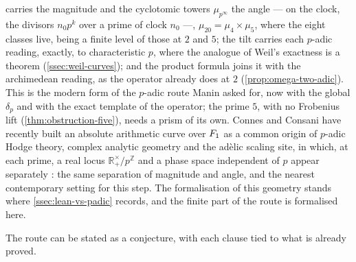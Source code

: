 carries the magnitude and the cyclotomic towers
$\mu_{p^\infty}$ the angle --- on the clock, the
divisors $n_0p^k$ over a prime of clock $n_0$ ---, $\mu_{20}=\mu_4\times\mu_5$,
    where the eight classes live, being a finite level of those at $2$ and $5$; the tilt \cite{scholze12} carries each $p$-adic reading, exactly, to characteristic $p$, where the analogue of Weil's exactness is a theorem (\cref{ssec:weil-curves}); and the product formula joins it with the archimedean reading, as the
    operator already does at $2$ (\cref{prop:omega-two-adic}).  This is the modern form of the $p$-adic route
    Manin asked for, now with the global $\delta_p$ and with the exact template of the operator; the prime
    $5$, with no Frobenius lift (\cref{thm:obstruction-five}), needs a prism of its own.  Connes and
    Consani have recently built an absolute arithmetic curve over $F_1$ as a common origin of
    $p$-adic Hodge theory, complex analytic geometry and the ad\`elic scaling site, in which, at each
    prime, a real locus $\mathbb{R}_+^\times/p^{\mathbb{Z}}$ and a phase space independent of $p$ appear separately
    \cite{connesconsani26}: the same separation of magnitude and angle, and the nearest contemporary
    setting for this step.  The formalisation of this geometry stands where \cref{ssec:lean-vs-padic} records, and the finite part of the route is formalised here.

The route can be stated as a conjecture, with each clause tied to what is already proved.

